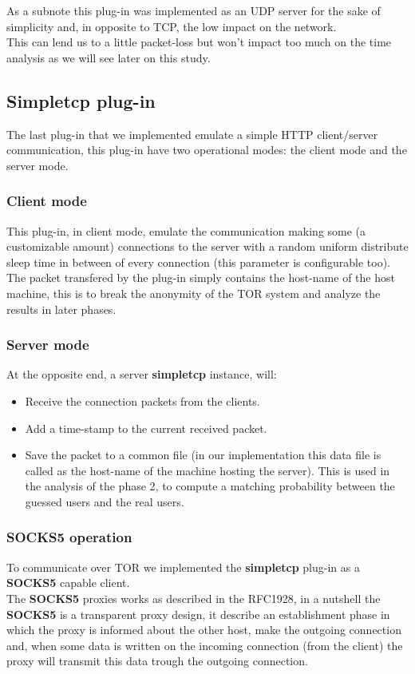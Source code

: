 As a subnote this plug-in was implemented as an UDP server for the sake of
simplicity and, in opposite to TCP, the low impact on the network.\\
This can lend us to a little packet-loss but won't impact too much on the time analysis
as we will see later on this study.

\subsection{Simpletcp plug-in}
\label{subsec:simpletcp}
The last plug-in that we implemented emulate a simple HTTP client/server communication,
this plug-in have two operational modes: the client mode and the server mode.
\subsubsection {Client mode}
\label{sec:simpletcpclient}
This plug-in, in client mode, emulate the communication making some (a customizable amount)
connections to the server
with a random uniform distribute sleep time in between of every connection
(this parameter is configurable too).\\
The packet transfered by the plug-in simply contains the host-name of the
host machine, this is to break the anonymity of the TOR system and analyze the results
in later phases.\\
\subsubsection {Server mode}
At the opposite end, a server \textbf{simpletcp} instance, will:
\begin{itemize}
	\item Receive the connection packets from the clients.
	\item Add a time-stamp to the current received packet.
	\item Save the packet to a common file (in our implementation this data
	file is called as the host-name of the machine hosting the server).
	This is used in the analysis of the phase 2, to compute a matching probability
	between the guessed users and the real users.
\end{itemize}


\subsubsection {SOCKS5 operation}
To communicate over TOR we implemented the \textbf{simpletcp} plug-in as a \textbf{SOCKS5} capable
client.\\
The \textbf{SOCKS5} proxies works as described in the RFC1928\cite{leech1996rfc},
in a nutshell the \textbf{SOCKS5} is a transparent proxy design, it describe an establishment
phase in which the proxy is informed about the other host, make the outgoing connection
and, when some data is written on the incoming connection (from the client)
the proxy will transmit this data trough the outgoing connection.\\

